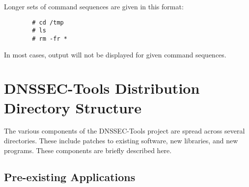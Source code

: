 \documentclass[12pt]{article}
\begin{document}
Longer sets of command sequences are given in this format:
\begin{verbatim}
        # cd /tmp
        # ls
        # rm -fr *
\end{verbatim}
In most cases, output will not be displayed for given command sequences.


\clearpage

\section{DNSSEC-Tools Distribution Directory Structure}
\label{directorystructure}

The various components of the DNSSEC-Tools project are spread across several
directories.  These include patches to existing software, new libraries, and
new programs.  These components are briefly described here.


\subsection{Pre-existing Applications}
\end{document}
